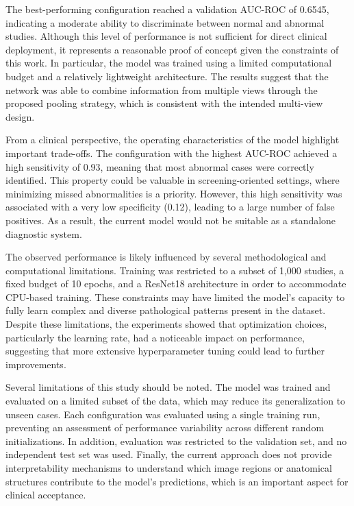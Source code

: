 \documentclass[conference]{IEEEtran}
\begin{document}
The best-performing configuration reached a validation AUC-ROC of 0.6545, indicating a moderate ability to discriminate between normal and abnormal studies. Although this level of performance is not sufficient for direct clinical deployment, it represents a reasonable proof of concept given the constraints of this work. In particular, the model was trained using a limited computational budget and a relatively lightweight architecture. The results suggest that the network was able to combine information from multiple views through the proposed pooling strategy, which is consistent with the intended multi-view design.

From a clinical perspective, the operating characteristics of the model highlight important trade-offs. The configuration with the highest AUC-ROC achieved a high sensitivity of 0.93, meaning that most abnormal cases were correctly identified. This property could be valuable in screening-oriented settings, where minimizing missed abnormalities is a priority. However, this high sensitivity was associated with a very low specificity (0.12), leading to a large number of false positives. As a result, the current model would not be suitable as a standalone diagnostic system.

The observed performance is likely influenced by several methodological and computational limitations. Training was restricted to a subset of 1,000 studies, a fixed budget of 10 epochs, and a ResNet18 architecture in order to accommodate CPU-based training. These constraints may have limited the model’s capacity to fully learn complex and diverse pathological patterns present in the dataset. Despite these limitations, the experiments showed that optimization choices, particularly the learning rate, had a noticeable impact on performance, suggesting that more extensive hyperparameter tuning could lead to further improvements.

Several limitations of this study should be noted. The model was trained and evaluated on a limited subset of the data, which may reduce its generalization to unseen cases. Each configuration was evaluated using a single training run, preventing an assessment of performance variability across different random initializations. In addition, evaluation was restricted to the validation set, and no independent test set was used. Finally, the current approach does not provide interpretability mechanisms to understand which image regions or anatomical structures contribute to the model’s predictions, which is an important aspect for clinical acceptance.
\end{document}
